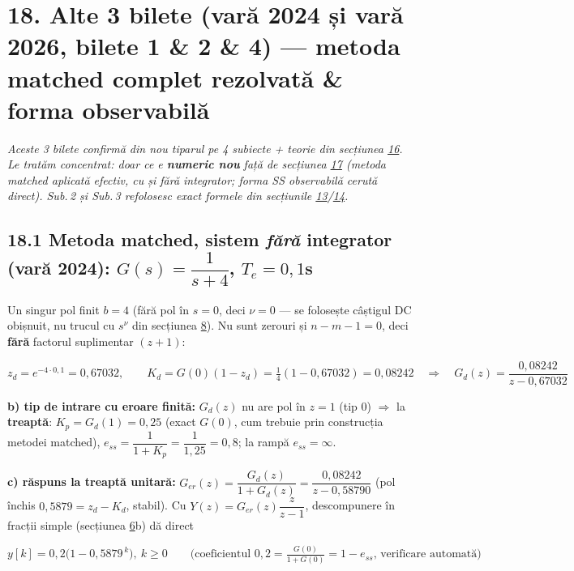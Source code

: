 \documentclass[10pt,a4paper]{article}
\begin{document}
\section*{18. Alte 3 bilete (vară 2024 și vară 2026, bilete 1 \& 2 \& 4) — metoda matched complet rezolvată \& forma observabilă}\label{sec:18}
\textit{Aceste 3 bilete confirmă din nou tiparul pe 4 subiecte + teorie din secțiunea \hyperref[sec:16]{16}. Le tratăm concentrat: doar ce e \textbf{numeric nou} față de secțiunea \hyperref[sec:17]{17} (metoda matched aplicată efectiv, cu și fără integrator; forma SS observabilă cerută direct). Sub.\,2 și Sub.\,3 refolosesc exact formele din secțiunile \hyperref[sec:13]{13}/\hyperref[sec:14]{14}.}

\subsection*{18.1 Metoda matched, sistem \emph{fără} integrator (vară 2024): $G(s)=\dfrac1{s+4}$, $T_e{=}0{,}1$s}
Un singur pol finit $b{=}4$ (fără pol în $s{=}0$, deci $\nu{=}0$ — se folosește câștigul DC obișnuit, nu trucul cu $s^\nu$ din secțiunea \hyperref[sec:8]{8}). Nu sunt zerouri și $n{-}m{-}1{=}0$, deci \textbf{fără} factorul suplimentar $(z+1)$:
\begin{keyeq}\color{red!65!black}
$$z_d=e^{-4\cdot0,1}=0{,}67032,\qquad K_d=G(0)(1-z_d)=\tfrac14(1-0{,}67032)=0{,}08242\quad\Rightarrow\quad G_d(z)=\dfrac{0{,}08242}{z-0{,}67032}$$
\end{keyeq}
\textbf{b) tip de intrare cu eroare finită:} $G_d(z)$ nu are pol în $z{=}1$ (tip 0) $\Rightarrow$ la \textbf{treaptă}: $K_p{=}G_d(1){=}0{,}25$ (exact $G(0)$, cum trebuie prin construcția metodei matched), $e_{ss}=\dfrac1{1+K_p}=\dfrac1{1,25}=0{,}8$; la rampă $e_{ss}{=}\infty$.

\textbf{c) răspuns la treaptă unitară:} $G_{er}(z)=\dfrac{G_d(z)}{1+G_d(z)}=\dfrac{0{,}08242}{z-0{,}58790}$ (pol închis $0{,}5879{=}z_d{-}K_d$, stabil). Cu $Y(z)=G_{er}(z)\dfrac{z}{z-1}$, descompunere în fracții simple (secțiunea \hyperref[sec:6]{6}b) dă direct
\begin{keyeq}\color{red!65!black}
$$y[k]=0{,}2\big(1-0{,}5879^{\,k}\big),\ k\ge0\qquad\big(\text{coeficientul }0{,}2=\tfrac{G(0)}{1+G(0)}=1-e_{ss}\text{, verificare automată}\big)$$
\end{keyeq}
\end{document}
